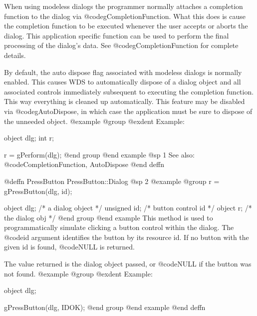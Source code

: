 When using modeless dialogs the programmer normally attaches a completion
function to the dialog via @code{gCompletionFunction}.  What this does
is cause the completion function to be executed whenever the user
accepts or aborts the dialog.  This application specific function can be
used to perform the final processing of the dialog's data.  See
@code{gCompletionFunction} for complete details.

By default, the auto dispose flag associated with modeless dialogs is
normally enabled.  This causes WDS to automatically dispose of a dialog
object and all associated controls immediately subsequent to executing
the completion function.  This way everything is cleaned up automatically.
This feature may be disabled via @code{gAutoDispose}, in which case the
application must be sure to dispose of the unneeded object.
@example
@group
@exdent Example:

object  dlg;
int     r;

r = gPerform(dlg);
@end group
@end example
@sp 1
See also:  @code{CompletionFunction, AutoDispose}
@end deffn













@deffn {PressButton} PressButton::Dialog
@sp 2
@example
@group
r = gPressButton(dlg, id);

object    dlg;   /*  a dialog object   */
unsigned  id;    /*  button control id */
object    r;     /*  the dialog obj    */
@end group
@end example
This method is used to programmatically simulate clicking a button control
within the dialog.  The @code{id} argument identifies the button by its
resource id.  If no button with the given id is found, @code{NULL} is
returned.

The value returned is the dialog object passed, or @code{NULL} if the
button was not found.
@example
@group
@exdent Example:

object  dlg;

gPressButton(dlg, IDOK);
@end group
@end example
@end deffn




















